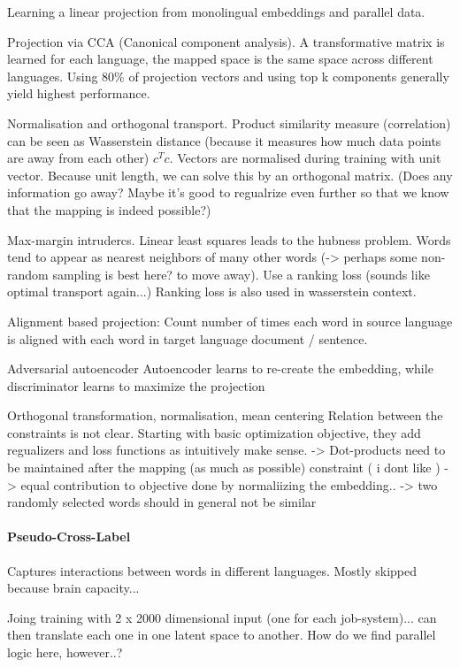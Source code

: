 \documentclass[a4paper,12pt,twoside,openright]{report}
\begin{document}
Learning a linear projection from monolingual embeddings and parallel data.

Projection via CCA (Canonical component analysis).
A transformative matrix is learned for each language, the mapped space is the same space across different languages.
Using 80\% of projection vectors and using top k components generally yield highest performance.

Normalisation and orthogonal transport.
Product similarity measure (correlation) can be seen as Wasserstein distance (because it measures how much data points are away from each other) $c^Tc$.
Vectors are normalised during training with unit vector.
Because unit length, we can solve this by an orthogonal matrix.
(Does any information go away? Maybe it's good to regualrize even further so that we know that the mapping is indeed possible?)

Max-margin intrudercs.
Linear least squares leads to the hubness problem. 
Words tend to appear as nearest neighbors of many other words
(-> perhaps some non-random sampling is best here? to move away).
Use a ranking loss (sounds like optimal transport again...)
Ranking loss is also used in wasserstein context.

Alignment based projection:
Count number of times each word in source language is aligned with each word in target language document / sentence.

Adversarial autoencoder
Autoencoder learns to re-create the embedding, while discriminator learns to maximize the projection

Orthogonal transformation, normalisation, mean centering
Relation between the constraints is not clear.
Starting with basic optimization objective, they add regualizers and loss functions as intuitively make sense.
-> Dot-products need to be maintained after the mapping (as much as possible) constraint ( i dont like )
-> equal contribution to objective done by normaliizing the embedding..
-> two randomly selected words should in general not be similar

\paragraph{Pseudo-Cross-Label}
Captures interactions between words in different languages.
Mostly skipped because brain capacity...

Joing training with 2 x 2000 dimensional input (one for each job-system)... can then translate each one in one latent space to another.
How do we find parallel logic here, however..?
\end{document}
